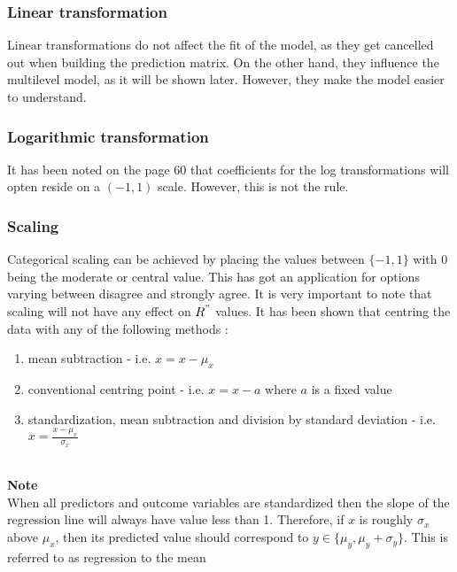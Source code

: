 \documentclass{article}
\begin{document}
\subsubsection*{Linear transformation}
Linear transformations do not affect the fit of the model, as they get cancelled out when building the prediction matrix. On the other hand, they influence the multilevel model, as it will be shown later.  However, they make the model easier to understand.
\subsubsection*{Logarithmic transformation}
It has been noted on the page 60 that coefficients for the log transformations will opten reside on a $(-1, 1)$ scale. However, this is not the rule.
\subsubsection*{Scaling}
Categorical scaling can be achieved by placing the values between $\{-1,1\}$ with $0$ being the moderate or central value. This has got an application for options varying between disagree and strongly agree. It is very important to note that scaling will not have any effect on $R^"$ values. It has been shown that centring the data with any of the following methods :
\begin{enumerate}
\item mean subtraction - i.e. $x = x - \mu_x$
\item conventional centring point - i.e. $x = x - a$ where $a$ is a fixed value
\item standardization, mean subtraction and division by standard deviation - i.e. $x = \frac{x - \mu_x}{\sigma_x}$
\end{enumerate}

\\
\textbf{Note}
\\
When all predictors and outcome variables are standardized then the slope of the regression line will always have value less than 1. Therefore, if $x$ is roughly $\sigma_x$ above $\mu_x$, then its predicted value should correspond to $y \in \{\mu_y, \mu_y + \sigma_y\}$. This is referred to as regression to the mean
\end{document}

